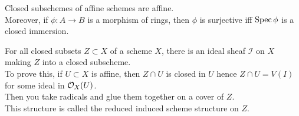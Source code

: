 \documentclass[../main.tex]{subfiles}
\begin{document}
\begin{crly}
Closed subschemes of affine schemes are affine.\\
Moreover, if $\phi: A \to B$ is a morphism of rings, then $\phi$ is surjective iff $\operatorname{Spec} \phi$ is a closed immersion.
\end{crly}
\begin{rmq}
For all closed subsets $Z \subset X$ of a scheme $X$, there is an ideal sheaf $ \mathcal{I}$ on $X$ making $Z$ into a closed subscheme.\\
To prove this, if $U \subset X$ is affine, then $Z\cap U$ is closed in $U$ hence $Z\cap U = V( I) $ for some ideal in $\mathcal{O}_X( U) $.\\
Then you take radicals and glue them together on a cover of $Z$.\\
This structure is called the reduced induced scheme structure on $Z$.
\end{rmq}
\end{document}
